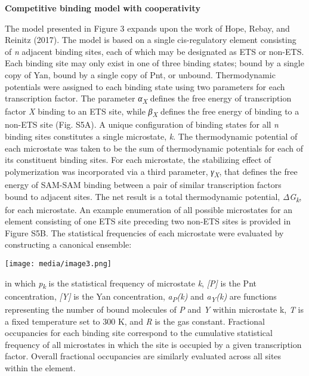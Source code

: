 \textbf{Competitive binding model with cooperativity}

The model presented in Figure 3 expands upon the work of Hope, Rebay, and Reinitz (2017). The model is based on a single cis-regulatory element consisting of \emph{n} adjacent binding sites, each of which may be designated as ETS or non-ETS. Each binding site may only exist in one of three binding states; bound by a single copy of Yan, bound by a single copy of Pnt, or unbound. Thermodynamic potentials were assigned to each binding state using two parameters for each transcription factor. The parameter \emph{α\textsubscript{X}} defines the free energy of transcription factor \emph{X} binding to an ETS site, while \emph{β\textsubscript{X}} defines the free energy of binding to a non-ETS site (Fig. S5A). A unique configuration of binding states for all \emph{n} binding sites constitutes a single microstate, \emph{k}. The thermodynamic potential of each microstate was taken to be the sum of thermodynamic potentials for each of its constituent binding sites. For each microstate, the stabilizing effect of polymerization was incorporated via a third parameter, \emph{γ\textsubscript{X}}, that defines the free energy of SAM-SAM binding between a pair of similar transcription factors bound to adjacent sites. The net result is a total thermodynamic potential, \emph{ΔG\textsubscript{k}}, for each microstate. An example enumeration of all possible microstates for an element consisting of one ETS site preceding two non-ETS sites is provided in Figure S5B. The statistical frequencies of each microstate were evaluated by constructing a canonical ensemble:

\texttt{[image: media/image3.png]}

in which \emph{p\textsubscript{k}} is the statistical frequency of microstate \emph{k}, \emph{{[}P{]}} is the Pnt concentration, \emph{{[}Y{]}} is the Yan concentration, \emph{a\textsubscript{P}(k)} and \emph{a\textsubscript{Y}(k)} are functions representing the number of bound molecules of \emph{P} and \emph{Y} within microstate k, \emph{T} is a fixed temperature set to 300 K, and \emph{R} is the gas constant. Fractional occupancies for each binding site correspond to the cumulative statistical frequency of all microstates in which the site is occupied by a given transcription factor. Overall fractional occupancies are similarly evaluated across all sites within the element.

